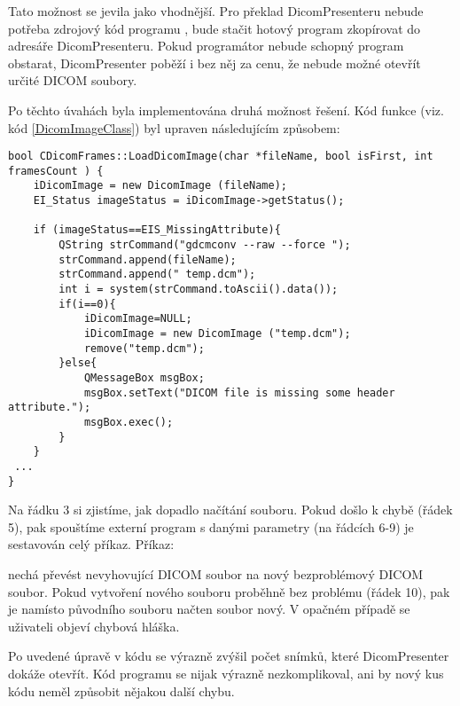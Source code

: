 Tato možnost se jevila jako vhodnější. Pro překlad DicomPresenteru nebude potřeba zdrojový kód programu , bude stačit hotový program zkopírovat do adresáře DicomPresenteru. Pokud programátor nebude schopný program obstarat, DicomPresenter poběží i bez něj za cenu, že nebude možné otevřít určité DICOM soubory.

Po těchto úvahách byla implementována druhá možnost řešení. Kód funkce  (viz. kód \ref{DicomImageClass}) byl upraven následujícím způsobem:

\begin{lstlisting}[label={xxx}]
bool CDicomFrames::LoadDicomImage(char *fileName, bool isFirst, int framesCount ) {
	iDicomImage = new DicomImage (fileName);
	EI_Status imageStatus = iDicomImage->getStatus();

	if (imageStatus==EIS_MissingAttribute){			
		QString strCommand("gdcmconv --raw --force ");
		strCommand.append(fileName);
		strCommand.append(" temp.dcm");
		int i = system(strCommand.toAscii().data());
		if(i==0){
			iDicomImage=NULL;
			iDicomImage = new DicomImage ("temp.dcm");
			remove("temp.dcm");
		}else{
			QMessageBox msgBox;
			msgBox.setText("DICOM file is missing some header attribute.");
			msgBox.exec();
		}		
	}
 ...
}
\end{lstlisting}

Na řádku 3 si zjistíme, jak dopadlo načítání souboru. Pokud došlo k chybě (řádek 5), pak spouštíme externí program  s danými parametry (na řádcích 6-9) je sestavován celý příkaz. Příkaz:


nechá převést nevyhovující DICOM soubor na nový bezproblémový DICOM soubor. Pokud vytvoření nového souboru proběhně bez problému (řádek 10), pak je namísto původního souboru načten soubor nový. V opačném případě se uživateli objeví chybová hláška.

Po uvedené úpravě v kódu se výrazně zvýšil počet snímků, které DicomPresenter dokáže otevřít. Kód programu se nijak výrazně nezkomplikoval, ani by nový kus kódu neměl způsobit nějakou další chybu.



